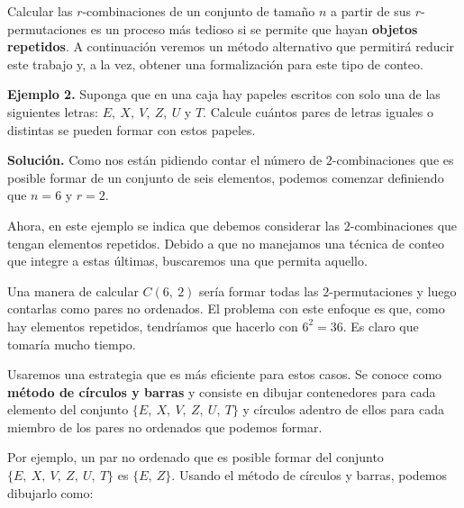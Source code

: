 \documentclass[12pt]{article}
\begin{document}
Calcular las $r$-combinaciones de un conjunto de tamaño $n$ a partir de sus $r$-permutaciones es un proceso más tedioso si se permite que hayan \textbf{objetos repetidos}. A continuación veremos un método alternativo que permitirá reducir este trabajo y, a la vez, obtener una formalización para este tipo de conteo.

\textbf{Ejemplo 2.} Suponga que en una caja hay papeles escritos con solo una de las siguientes letras: $E, \ X, \ V, \ Z, \ U$ y $T$. Calcule cuántos pares de letras iguales o distintas se pueden formar con estos papeles.

\textbf{Solución.} Como nos están pidiendo contar el número de $2$-combinaciones que es posible formar de un conjunto de seis elementos, podemos comenzar definiendo que $n = 6$ y $r = 2$.

Ahora, en este ejemplo se indica que debemos considerar las $2$-combinaciones que tengan elementos repetidos. Debido a que no manejamos una técnica de conteo que integre a estas últimas, buscaremos una que permita aquello.

Una manera de calcular $C(6, \ 2)$ sería formar todas las $2$-permutaciones y luego contarlas como pares no ordenados. El problema con este enfoque es que, como hay elementos repetidos, tendríamos que hacerlo con $6^{2} = 36$. Es claro que tomaría mucho tiempo.

Usaremos una estrategia que es más eficiente para estos casos. Se conoce como \textbf{método de círculos y barras} y consiste en dibujar contenedores para cada elemento del conjunto $\{E, \ X, \ V, \ Z, \ U, \ T\}$ y círculos adentro de ellos para cada miembro de los pares no ordenados que podemos formar.

Por ejemplo, un par no ordenado que es posible formar del conjunto $\{E, \ X, \ V, \ Z, \ U, \ T\}$ es $\{E, \ Z\}$. Usando el método de círculos y barras, podemos dibujarlo como:

\begin{figure}[hbt!]
\centering


\end{figure}
\end{document}
